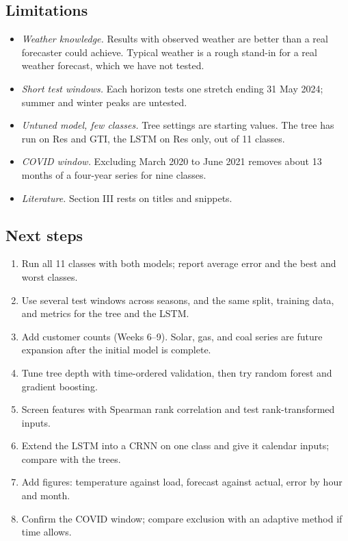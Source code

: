 \documentclass[conference]{IEEEtran}
\begin{document}
\subsection{Limitations}
\begin{itemize}
\item \textit{Weather knowledge.} Results with observed weather are better than a real forecaster could achieve. Typical weather is a rough stand-in for a real weather forecast, which we have not tested.
\item \textit{Short test windows.} Each horizon tests one stretch ending 31 May 2024; summer and winter peaks are untested.
\item \textit{Untuned model, few classes.} Tree settings are starting values. The tree has run on Res and GTI, the LSTM on Res only, out of 11 classes.
\item \textit{COVID window.} Excluding March 2020 to June 2021 removes about 13 months of a four-year series for nine classes.
\item \textit{Literature.} Section III rests on titles and snippets.
\end{itemize}

\subsection{Next steps}
\begin{enumerate}[leftmargin=1.6em]
\item Run all 11 classes with both models; report average error and the best and worst classes.
\item Use several test windows across seasons, and the same split, training data, and metrics for the tree and the LSTM.
\item Add customer counts (Weeks 6--9). Solar, gas, and coal series are future expansion after the initial model is complete.
\item Tune tree depth with time-ordered validation, then try random forest and gradient boosting.
\item Screen features with Spearman rank correlation and test rank-transformed inputs.
\item Extend the LSTM into a CRNN on one class and give it calendar inputs; compare with the trees.
\item Add figures: temperature against load, forecast against actual, error by hour and month.
\item Confirm the COVID window; compare exclusion with an adaptive method if time allows.
\end{enumerate}
\end{document}
